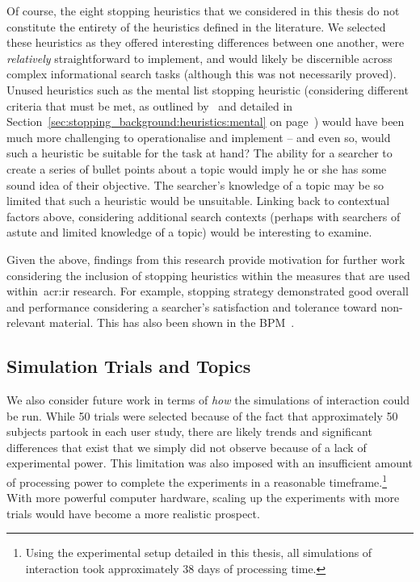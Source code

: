 Of course, the eight stopping heuristics that we considered in this thesis do not constitute the entirety of the heuristics defined in the literature. We selected these heuristics as they offered interesting differences between one another, were \emph{relatively} straightforward to implement, and would likely be discernible across complex informational search tasks (although this was not necessarily proved). Unused heuristics such as the mental list stopping heuristic (considering different criteria that must be met, as outlined by~\cite{nickles1995judgment} and detailed in Section~\ref{sec:stopping_background:heuristics:mental} on page~\pageref{sec:stopping_background:heuristics:mental}) would have been much more challenging to operationalise and implement -- and even so, would such a heuristic be suitable for the task at hand? The ability for a searcher to create a series of bullet points about a topic would imply he or she has some sound idea of their objective. The searcher's knowledge of a topic may be so limited that such a heuristic would be unsuitable. Linking back to contextual factors above, considering additional search contexts (perhaps with searchers of astute and limited knowledge of a topic) would be interesting to examine.

Given the above, findings from this research provide motivation for further work considering the inclusion of stopping heuristics within the measures that are used within~\gls{acr:ir} research. For example, stopping strategy  demonstrated good overall and performance considering a searcher's satisfaction and tolerance toward non-relevant material. This has also been shown in the BPM~\citep{zhang2017bejewled}.

\subsection{Simulation Trials and Topics}\label{sec:conclusions:future:running}
We also consider future work in terms of \emph{how} the simulations of interaction could be run. While 50 trials were selected because of the fact that approximately 50 subjects partook in each user study, there are likely trends and significant differences that exist that we simply did not observe because of a lack of experimental power. This limitation was also imposed with an insufficient amount of processing power to complete the experiments in a reasonable timeframe.\footnote{Using the experimental setup detailed in this thesis, all simulations of interaction took approximately $38$ days of processing time.} With more powerful computer hardware, scaling up the experiments with more trials would have become a more realistic prospect.

